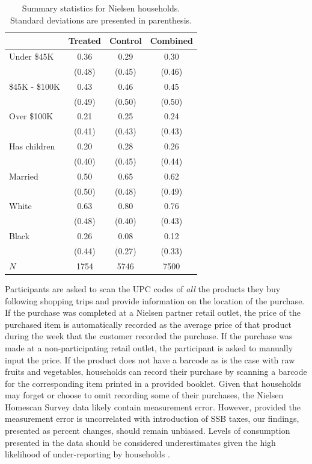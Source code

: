 \documentclass[12pt]{article}
\begin{document}
\begin{table}[htbp]\centering
\begin{tabular}{l*{3}{c}}
\hline\hline
	&\multicolumn{1}{c}{Treated}&\multicolumn{1}{c}{Control}&\multicolumn{1}{c}{Combined} \\
\hline
Under \$45K	&				0.36&				0.29&				0.30 \\
						&			(0.48)&			(0.45)&			(0.46) \\
\$45K - \$100K&				0.43&				0.46&				0.45 \\
						&			(0.49)&			(0.50)&			(0.50) \\
Over \$100K	&				0.21&				0.25&				0.24 \\
						&			(0.41)&			(0.43)&			(0.43) \\
Has children&				0.20&				0.28&				0.26 \\
						&			(0.40)&			(0.45)&			(0.44) \\
Married		 &				0.50&				0.65&				0.62 \\
						&			(0.50)&			(0.48)&			(0.49) \\
White			 &				0.63&				0.80&				0.76 \\
						&			(0.48)&			(0.40)&			(0.43) \\
Black			 &				0.26&				0.08&				0.12 \\
						&			(0.44)&			(0.27)&			(0.33) \\
\hline
\(N\)			 &				1754&				5746&				7500 \\
\hline\hline
\end{tabular}
\caption{Summary statistics for Nielsen households. Standard deviations are presented in parenthesis. \label{panelist_dems}}
\end{table}

Participants are asked to scan the UPC codes of \textit{all} the products they buy following shopping trips and provide information on the location of the purchase. If the purchase was completed at a Nielsen partner retail outlet, the price of the purchased item is automatically recorded as the average price of that product during the week that the customer recorded the purchase. If the purchase was made at a non-participating retail outlet, the participant is asked to manually input the price. If the product does not have a barcode as is the case with raw fruits and vegetables, households can record their purchase by scanning a barcode for the corresponding item printed in a provided booklet. Given that households may forget or choose to omit recording some of their purchases, the Nielsen Homescan Survey data likely contain measurement error. However, provided the measurement error is uncorrelated with introduction of SSB taxes, our findings, presented as percent changes, should remain unbiased. Levels of consumption presented in the data should be considered underestimates given the high likelihood of under-reporting by households \parencite{einav2010recording}.
\end{document}
